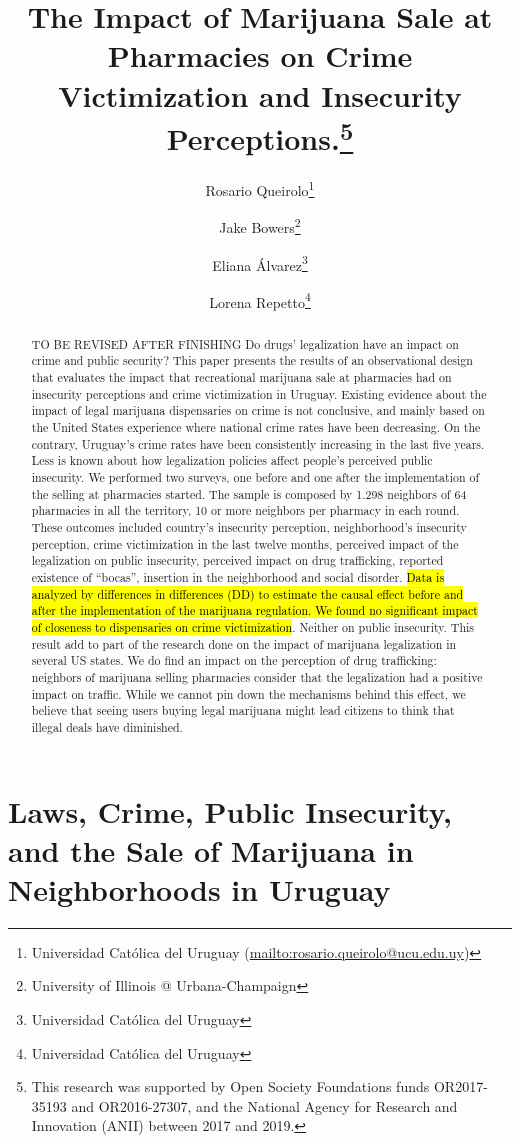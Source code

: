 \documentclass[11pt]{article}
\author{Rosario Queirolo\thanks{Universidad Católica del Uruguay (\url{mailto:rosario.queirolo@ucu.edu.uy})}
	\and Jake Bowers\thanks{University of Illinois @ Urbana-Champaign}
	\and Eliana Álvarez\thanks{Universidad Católica del Uruguay}
	\and Lorena Repetto\thanks{Universidad Católica del Uruguay}}
\title{The Impact of Marijuana Sale at Pharmacies on Crime Victimization and Insecurity Perceptions.\thanks{This research was supported by Open Society Foundations funds OR2017-35193 and OR2016-27307, and the National Agency for Research and Innovation (ANII) between 2017 and 2019.}}
\begin{document}
\maketitle


\begin{abstract}

TO BE REVISED AFTER FINISHING Do drugs' legalization have an impact on crime and public security? This paper presents the results of an observational design that evaluates the impact that recreational marijuana sale at pharmacies had on insecurity perceptions and crime victimization in Uruguay. Existing evidence about the impact of legal marijuana dispensaries on crime is not conclusive, and mainly based on the United States experience where national crime rates have been decreasing. On the contrary, Uruguay's crime rates have been consistently increasing in the last five years. Less is known about how legalization policies affect people's perceived public insecurity. We performed two surveys, one before and one after the implementation of the selling at pharmacies started. The sample is composed by 1.298 neighbors of 64 pharmacies in all the territory, 10 or more neighbors per pharmacy in each round. These outcomes included country’s insecurity perception, neighborhood’s insecurity perception, crime victimization in the last twelve months, perceived impact of the legalization on public insecurity, perceived impact on drug trafficking, reported existence of ``bocas'', insertion in the neighborhood and social disorder. \hl{Data is analyzed by differences in differences (DD) to estimate the causal effect before and after the implementation of the marijuana regulation. We found no significant impact of closeness to dispensaries on crime victimization}. Neither on public insecurity. This result add to part of the research done on the impact of marijuana legalization in several US states. We do find an impact on the perception of drug trafficking: neighbors of marijuana selling pharmacies consider that the legalization had a positive impact on traffic. While we cannot pin down the mechanisms behind this effect, we believe that seeing users buying legal marijuana might lead citizens to think that illegal deals have diminished.

\end{abstract}

\section[]{Laws, Crime, Public Insecurity, and the Sale of Marijuana in Neighborhoods in Uruguay}
\end{document}
